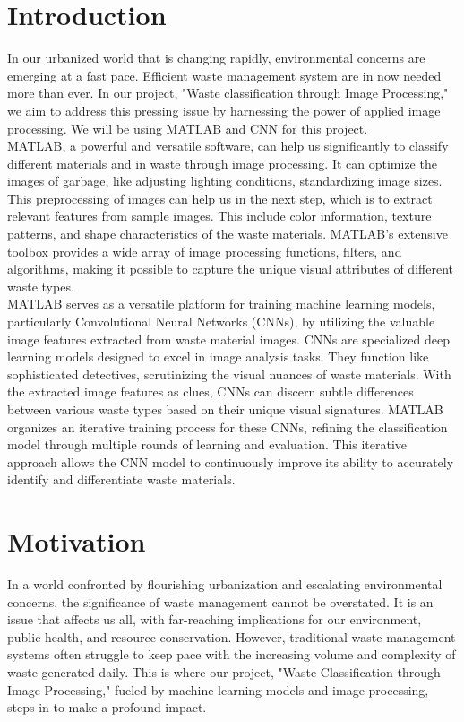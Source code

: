 \documentclass{article}
\begin{document}
\section{Introduction}
    In our urbanized world that is changing rapidly, environmental concerns are emerging at a fast pace. Efficient waste management system are in now needed more than ever. In our project, "Waste classification through Image Processing," we aim to address this pressing issue by harnessing the power of applied image processing. We will be using MATLAB and CNN for this project.
    \\
    MATLAB, a powerful and versatile software, can help us significantly to classify different materials and in waste through image processing. It can optimize the images of garbage, like adjusting lighting conditions, standardizing image sizes. This preprocessing of images can help us in the next step, which is to extract relevant features from sample images. This include color information, texture patterns, and shape characteristics of the waste materials. MATLAB's extensive toolbox provides a wide array of image processing functions, filters, and algorithms, making it possible to capture the unique visual attributes of different waste types.
    \\
    MATLAB serves as a versatile platform for training machine learning models, particularly Convolutional Neural Networks (CNNs), by utilizing the valuable image features extracted from waste material images. CNNs are specialized deep learning models designed to excel in image analysis tasks. They function like sophisticated detectives, scrutinizing the visual nuances of waste materials. With the extracted image features as clues, CNNs can discern subtle differences between various waste types based on their unique visual signatures. MATLAB organizes an iterative training process for these CNNs, refining the classification model through multiple rounds of learning and evaluation. This iterative approach allows the CNN model to continuously improve its ability to accurately identify and differentiate waste materials. 
\section{Motivation}
    In a world confronted by flourishing urbanization and escalating environmental concerns, the significance of waste management cannot be overstated. It is an issue that affects us all, with far-reaching implications for our environment, public health, and resource conservation. However, traditional waste management systems often struggle to keep pace with the increasing volume and complexity of waste generated daily. This is where our project, "Waste Classification through Image Processing," fueled by machine learning models and image processing, steps in to make a profound impact.
\end{document}
